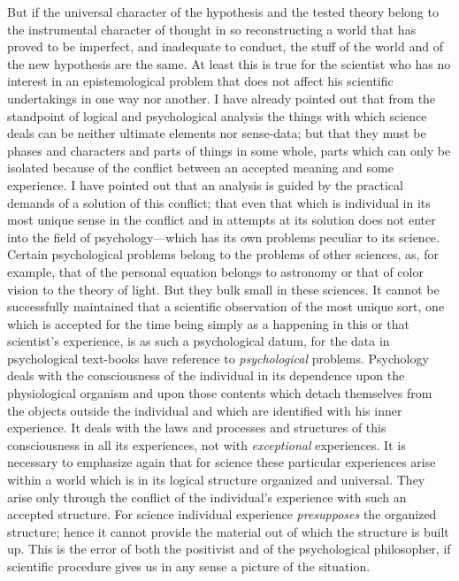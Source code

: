 \documentclass[12pt]{article}
\begin{document}
But if the universal character of the hypothesis and
the tested theory belong to the instrumental character
of thought in so reconstructing a world that has proved
to be imperfect, and inadequate to conduct, the stuff
of the world and of the new hypothesis are the same.
At least this is true for the scientist who has no interest
in an epistemological problem that does not
affect his scientific undertakings in one way nor another.
I have already pointed out that from the standpoint
of logical and psychological analysis the things
with which science deals can be neither ultimate elements
nor sense-data; but that they must be phases and
characters and parts of things in some whole, parts
which can only be isolated because of the conflict between
an accepted meaning and some experience. I have
pointed out that an analysis is guided by the practical
demands of a solution of this conflict; that even that
which is individual in its most unique sense in the conflict
and in attempts at its solution does not enter into
the field of psychology—which has its own problems
peculiar to its science. Certain psychological problems
belong to the problems of other sciences, as, for example,
that of the personal equation belongs to astronomy
or that of color vision to the theory of light. But they
bulk small in these sciences. It cannot be successfully
maintained that a scientific observation of the most
unique sort, one which is accepted for the time being
simply as a happening in this or that scientist's experience,
is as such a psychological datum, for the data in
psychological text-books have reference to \emph{psychological}
problems. Psychology deals with the consciousness
of the individual in its dependence upon the physiological
organism and upon those contents which detach
themselves from the objects outside the individual and
which are identified with his inner experience. It deals
with the laws and processes and structures of this consciousness
in all its experiences, not with \emph{exceptional}
experiences. It is necessary to emphasize again that
for science these particular experiences arise within a
world which is in its logical structure organized and
universal. They arise only through the conflict of the
individual's experience with such an accepted structure.
For science individual experience \emph{presupposes} the organized
structure; hence it cannot provide the material
out of which the structure is built up. This is the error
of both the positivist and of the psychological philosopher,
if scientific procedure gives us in any sense a
picture of the situation.
\end{document}
